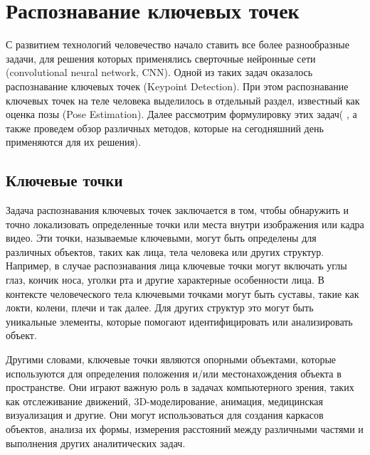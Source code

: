 \section{Распознавание ключевых точек}
\label{sec:Chapter2} 

С развитием технологий человечество начало ставить все более разнообразные задачи, для решения которых применялись сверточные нейронные сети (convolutional neural network, CNN). Одной из таких задач оказалось распознавание ключевых точек (Keypoint Detection). При этом распознавание ключевых точек на теле человека выделилось в отдельный раздел, известный как оценка позы (Pose Estimation). Далее рассмотрим формулировку этих задач( , а также проведем обзор различных методов, которые на сегодняшний день применяются для их решения).

\subsection{Ключевые точки}

Задача распознавания ключевых точек заключается в том, чтобы обнаружить и точно локализовать определенные точки или места внутри изображения или кадра видео. Эти точки, называемые ключевыми, могут быть определены для различных объектов, таких как лица, тела человека или других структур. Например, в случае распознавания лица ключевые точки могут включать углы глаз, кончик носа, уголки рта и другие характерные особенности лица. В контексте человеческого тела ключевыми точками могут быть суставы, такие как локти, колени, плечи и так далее. Для других структур это могут быть уникальные элементы, которые помогают идентифицировать или анализировать объект.

Другими словами, ключевые точки являются опорными объектами, которые используются для определения положения и/или местонахождения объекта в пространстве. Они играют важную роль в задачах компьютерного зрения, таких как отслеживание движений, 3D-моделирование, анимация, медицинская визуализация и другие. Они могут использоваться для создания каркасов объектов, анализа их формы, измерения расстояний между различными частями и выполнения других аналитических задач.

